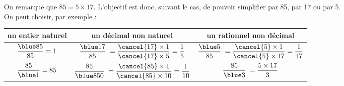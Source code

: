    On remarque que $85 =5\times17$. L'objectif est donc, suivant le cas, de pouvoir simplifier par 85, par 17 ou par 5. \\
   On peut choisir, par exemple :
   \begin{center}
      {
      \begin{tabular}{|*3{C{4}|}}
         \hline
         un entier naturel & un décimal non naturel & un rationnel non décimal \\
         \hline
         $\dfrac{\blue 85}{85} =1$ & $\dfrac{\blue17}{85} \;   =\dfrac{\cancel{17}\times1}{\cancel{17}\times5} =\dfrac15$ & $\dfrac{\blue 5}{85} \; =\dfrac{\cancel{5}\times1}{\cancel{5}\times17} =\dfrac{1}{17}$ \\
         \hline
         $\dfrac{85}{\blue 1} =85$ & $\dfrac{85}{\blue 850}\;  =\dfrac{\cancel{85}\times1}{\cancel{85}\times10} =\dfrac{1}{10}$ & $\dfrac{85}{\blue 3} \; =\dfrac{5\times17}{3}$ \\
         \hline
      \end{tabular}}
   \end{center}
